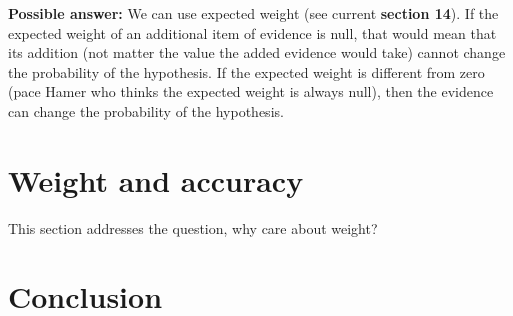 \documentclass[
  10pt,
  dvipsnames,enabledeprecatedfontcommands]{scrartcl}
\begin{document}
\textbf{Possible answer:} We can use expected weight (see current
\textbf{section 14}). If the expected weight of an additional item of
evidence is null, that would mean that its addition (not matter the
value the added evidence would take) cannot change the probability of
the hypothesis. If the expected weight is different from zero (pace
Hamer who thinks the expected weight is always null), then the evidence
can change the probability of the hypothesis.


\hypertarget{weight-and-accuracy}{%
\section{Weight and accuracy}\label{weight-and-accuracy}}

This section addresses the question, why care about weight?

\hypertarget{conclusion}{%
\section*{Conclusion}\label{conclusion}}
\end{document}
